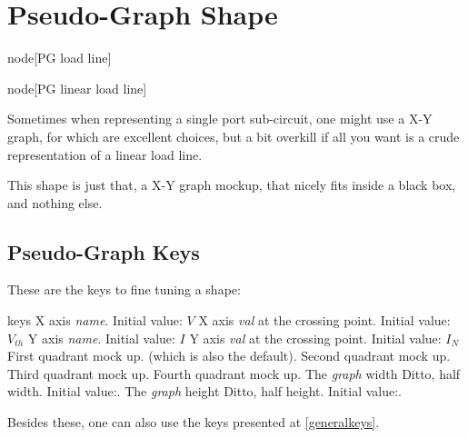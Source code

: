 \documentclass[10pt]{article}
\begin{document}
\section{Pseudo-Graph Shape}
\begin{codestore}[PGDef]
node[PG load line]{}

node[PG linear load line]
\end{codestore}


Sometimes when representing a single port sub-circuit, one might use a X-Y graph, for which  are excellent choices, but a bit overkill if all you want is a crude representation of a linear load line.

This shape is just that, a X-Y graph mockup, that nicely fits inside a black box, and nothing else.

\begin{center}%
\end{center}


\subsection{Pseudo-Graph Keys}

These are the keys to fine tuning a shape:
\begin{describelist*}[30mm]{keys}
    {X axis \emph{name}. Initial value: $V$}
    {X axis \emph{val} at the crossing point. Initial value: $V_{th}$}
   {Y axis \emph{name}. Initial value: $I$}
   {Y axis \emph{val} at the crossing point. Initial value: $I_{N}$}
   {First quadrant mock up. (which is also the default).}
    {Second quadrant mock up.}
     {Third quadrant mock up.}
    {Fourth quadrant mock up.}
    {The \emph{graph} width}
    {Ditto, half width. Initial value:.}
    {The \emph{graph} height}
    {Ditto, half height. Initial value:.}
\end{describelist*}
\begin{tsremark}
Besides these, one can also use the keys presented at \ref{generalkeys}.
\end{tsremark}
\end{document}
